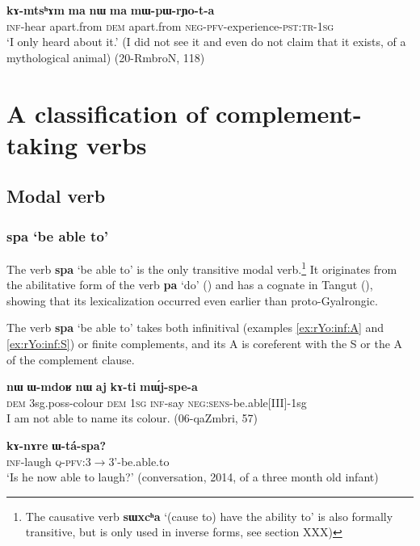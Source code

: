 \documentclass[oldfontcommands,oneside,a4paper,11pt]{article}
\newcommand{\ipa}[1]{\textbf{\phon#1}} %
\newcommand{\jpg}[2]{\ipa{#1} `#2'} %
\begin{document}
\begin{exe}
\ex \label{ex:manWma.compl}
\gll \ipa{kɤ-mtsʰɤm} 	\ipa{ma} 	\ipa{nɯ} 	\ipa{ma} 	\ipa{mɯ-pɯ-rɲo-t-a} \\
\textsc{inf}-hear apart.from \textsc{dem} apart.from \textsc{neg-pfv}-experience-\textsc{pst:tr-1sg} \\
\glt `I only heard about it.' (I did not see it and even do not claim that it exists, of a mythological animal) (20-RmbroN, 118)
\end{exe}
 
  \section{A classification of complement-taking verbs} 
  \subsection{Modal verb}
  
    \subsubsection{\jpg{spa}{be able to}} \label{sec:spa}
The verb \jpg{spa}{be able to} is the only transitive modal verb.\footnote{The causative verb \jpg{sɯxcʰa}{(cause to) have the ability to} is also formally transitive, but is only used in inverse forms, see section XXX)} It originates from the abilitative form of the verb \ipa{pa} `do' (\citealt{jacques15causative}) and has a cognate in Tangut  (\citealt{jacques14esquisse}), showing that its lexicalization occurred even earlier than proto-Gyalrongic.

The verb \jpg{spa}{be able to} takes both infinitival (examples \ref{ex:rYo:inf:A} and \ref{ex:rYo:inf:S}) or finite complements, and its A is coreferent with the S or the A of the complement clause.

\begin{exe}
\ex  \label{ex:rYo:inf:A}
\gll
\ipa{nɯ} 	\ipa{ɯ-mdoʁ} 	\ipa{nɯ} 	\ipa{aj} 	\ipa{kɤ-ti} 	\ipa{mɯ́j-spe-a} \\
\textsc{dem} 3sg.poss-colour \textsc{dem} \textsc{1sg} \textsc{inf}-say \textsc{neg:sens}-be.able[III]-1sg \\
\glt I am not able to name its colour. (06-qaZmbri, 57)
\end{exe}

\begin{exe}
\ex  \label{ex:rYo:inf:S}
\gll 
 \ipa{kɤ-nɤre} 	\ipa{ɯ-tá-spa?}\\
 \textsc{inf}-laugh \textsc{q-pfv}:3$\rightarrow$3'-be.able.to\\
 \glt `Is he now able to laugh?' (conversation, 2014, of a three month old infant)
\end{exe}
    
\end{document}
